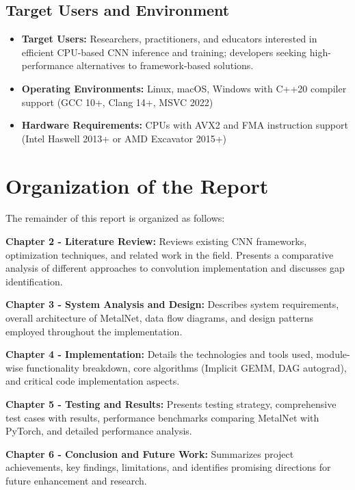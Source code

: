 \documentclass[12pt,oneside,a4paper]{report}
\begin{document}
\subsection{Target Users and Environment}

\begin{itemize}
    \item \textbf{Target Users:} Researchers, practitioners, and educators interested in efficient CPU-based CNN inference and training; developers seeking high-performance alternatives to framework-based solutions.
    \item \textbf{Operating Environments:} Linux, macOS, Windows with C++20 compiler support (GCC 10+, Clang 14+, MSVC 2022)
    \item \textbf{Hardware Requirements:} CPUs with AVX2 and FMA instruction support (Intel Haswell 2013+ or AMD Excavator 2015+)
\end{itemize}

\section{Organization of the Report}

The remainder of this report is organized as follows:

\textbf{Chapter 2 - Literature Review:} Reviews existing CNN frameworks, optimization techniques, and related work in the field. Presents a comparative analysis of different approaches to convolution implementation and discusses gap identification.

\textbf{Chapter 3 - System Analysis and Design:} Describes system requirements, overall architecture of MetalNet, data flow diagrams, and design patterns employed throughout the implementation.

\textbf{Chapter 4 - Implementation:} Details the technologies and tools used, module-wise functionality breakdown, core algorithms (Implicit GEMM, DAG autograd), and critical code implementation aspects.

\textbf{Chapter 5 - Testing and Results:} Presents testing strategy, comprehensive test cases with results, performance benchmarks comparing MetalNet with PyTorch, and detailed performance analysis.

\textbf{Chapter 6 - Conclusion and Future Work:} Summarizes project achievements, key findings, limitations, and identifies promising directions for future enhancement and research.

\newpage
\end{document}
